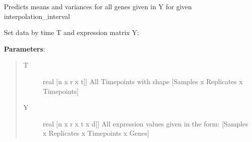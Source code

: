 \documentclass[letterpaper,10pt]{sphinxmanual}
\begin{document}
\begin{fulllineitems}
\begin{fulllineitems}
\end{fulllineitems}


\begin{fulllineitems}
\label{base:gptwosample.twosample.twosample.TwoSample.predict_means_variances}
Predicts means and variances for all genes given in Y for given interpolation\_interval

\end{fulllineitems}


\begin{fulllineitems}
\label{base:gptwosample.twosample.twosample.TwoSample.set_data}
Set data by time T and expression matrix Y:

\textbf{Parameters}:
\begin{quote}
\begin{description}
\item[{T}] \leavevmode{[}real {[}n x r x t{]}{]}
All Timepoints with shape {[}Samples x Replicates x Timepoints{]}

\item[{Y}] \leavevmode{[}real {[}n x r x t x d{]}{]}
All expression values given in the form: {[}Samples x Replicates x Timepoints x Genes{]}

\end{description}
\end{quote}

\end{fulllineitems}


\end{fulllineitems}

\end{document}
